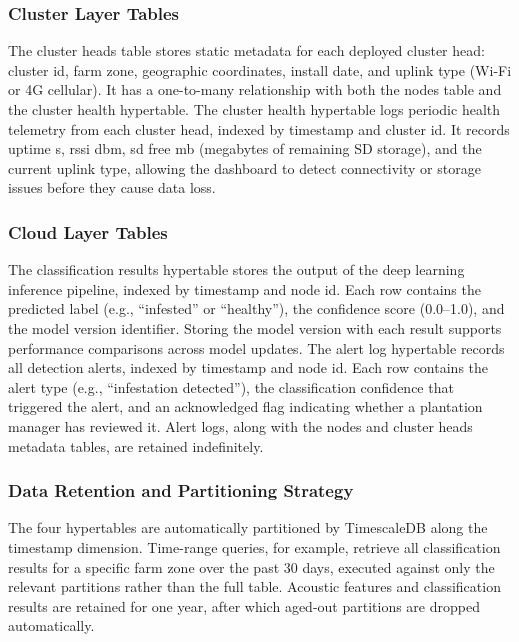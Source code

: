 \documentclass[12pt,a4paper,oneside]{memoir}
\begin{document}
\subsubsection{Cluster Layer Tables}

The cluster heads table stores static metadata for each deployed cluster head: cluster id, farm zone, geographic coordinates, install date, and uplink type (Wi-Fi or 4G cellular). It has a one-to-many relationship with both the nodes table and the cluster health hypertable. The cluster health hypertable logs periodic health telemetry from each cluster head, indexed by timestamp and cluster id. It records uptime s, rssi dbm, sd free mb (megabytes of remaining SD storage), and the current uplink type, allowing the dashboard to detect connectivity or storage issues before they cause data loss.

\subsubsection{Cloud Layer Tables}

The classification results hypertable stores the output of the deep learning inference pipeline, indexed by timestamp and node id. Each row contains the predicted label (e.g., ``infested'' or ``healthy''), the confidence score (0.0--1.0), and the model version identifier. Storing the model version with each result supports performance comparisons across model updates. The alert log hypertable records all detection alerts, indexed by timestamp and node id. Each row contains the alert type (e.g., ``infestation detected''), the classification confidence that triggered the alert, and an acknowledged flag indicating whether a plantation manager has reviewed it. Alert logs, along with the nodes and cluster heads metadata tables, are retained indefinitely.

\subsubsection{Data Retention and Partitioning Strategy}

The four hypertables are automatically partitioned by TimescaleDB along the timestamp dimension. Time-range queries, for example, retrieve all classification results for a specific farm zone over the past 30 days, executed against only the relevant partitions rather than the full table. Acoustic features and classification results are retained for one year, after which aged-out partitions are dropped automatically.
\end{document}
